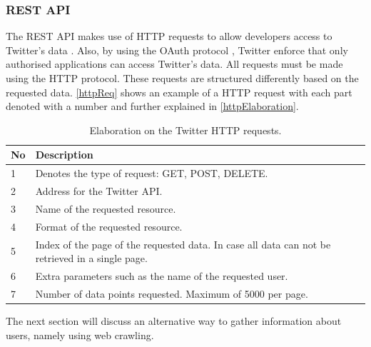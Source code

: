 \subsubsection{REST API}
The \ac{REST} \ac{API} makes use of \ac{HTTP} requests to allow developers
access to Twitter's data \citep{TwitterREST}. Also, by using the OAuth protocol
\citep{TwitterOAuth}, Twitter enforce that only authorised applications can
access Twitter's data. All requests must be made using the \ac{HTTP} protocol.
These requests are structured differently based on the requested data.
\autoref{httpReq} shows an example of a \ac{HTTP} request with each part denoted
with a number and further explained in \autoref{httpElaboration}.


\begin{table}[H] 
\begin{centering}
\begin{tabular}{|l|p{9cm}|l|}
\hline
\textbf{No}&	\textbf{Description}										\\\hline
1			&	Denotes the type of request: GET, POST, DELETE.				\\\hline
2			&	Address for the Twitter \ac{API}.							\\\hline
3			&	Name of the requested resource.	   							\\\hline
4			&	Format of the requested resource.							\\\hline
5			&	Index of the page of the requested data. In case all data can not be
retrieved in a single page.													\\\hline 
6			&	Extra parameters such as the name of the requested user.	\\\hline
7			&	Number of data points requested. Maximum of 5000 per page.	\\\hline
\end{tabular}
\caption{Elaboration on the Twitter HTTP requests.}
\label{httpElaboration}
\end{centering}
\end{table}

The next section will discuss an alternative way to gather information about
users, namely using  web crawling.
